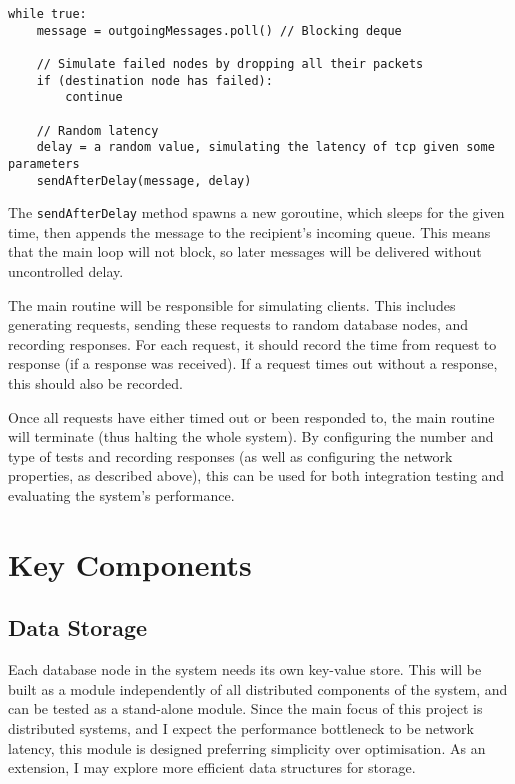 \documentclass[12pt,a4paper]{article}
\begin{document}
\begin{lstlisting}
while true:
    message = outgoingMessages.poll() // Blocking deque

    // Simulate failed nodes by dropping all their packets
    if (destination node has failed):
        continue

    // Random latency
    delay = a random value, simulating the latency of tcp given some parameters
    sendAfterDelay(message, delay)
\end{lstlisting}

The \verb|sendAfterDelay| method spawns a new goroutine, which sleeps for the given time, then appends the message to the recipient's incoming queue. This means that the main loop will not block, so later messages will be delivered without uncontrolled delay.

The main routine will be responsible for simulating clients. This includes generating requests, sending these requests to random database nodes, and recording responses. For each request, it should record the time from request to response (if a response was received). If a request times out without a response, this should also be recorded.

Once all requests have either timed out or been responded to, the main routine will terminate (thus halting the whole system). By configuring the number and type of tests and recording responses (as well as configuring the network properties, as described above), this can be used for both integration testing and evaluating the system's performance.


\section*{Key Components}

\subsection*{Data Storage}

Each database node in the system needs its own key-value store. This will be built as a module independently of all distributed components of the system, and can be tested as a stand-alone module. Since the main focus of this project is distributed systems, and I expect the performance bottleneck to be network latency, this module is designed preferring simplicity over optimisation. As an extension, I may explore more efficient data structures for storage.
\end{document}
